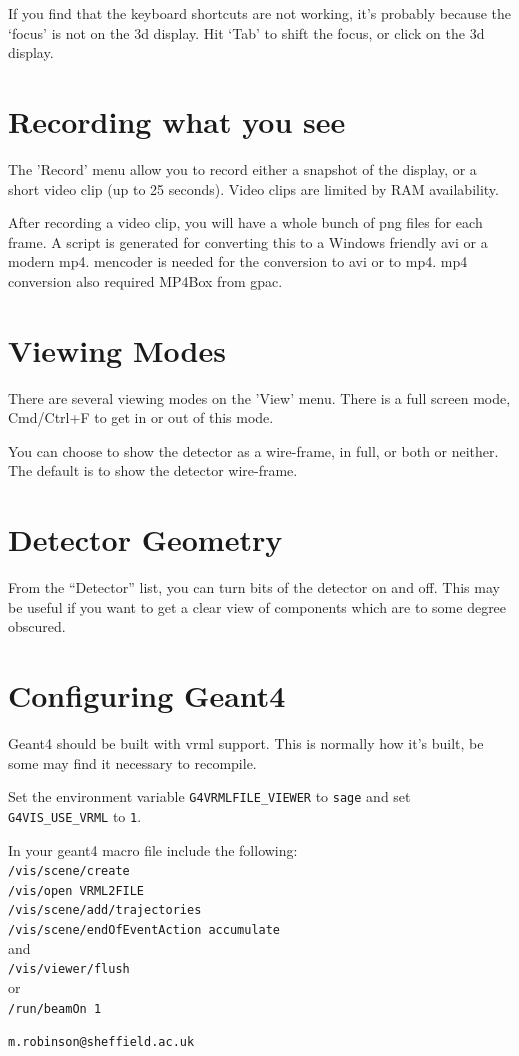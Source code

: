 \documentclass[12pt,a4]{article}
\begin{document}
If you find that the keyboard shortcuts are not working, it's probably because the `focus' is not on the 3d display.  Hit `Tab' to shift the focus, or click on the 3d display.

\section{Recording what you see}

The 'Record' menu allow you to record either a snapshot of the display, or a short video clip (up to 25 seconds).  Video clips are limited by RAM availability.

After recording a video clip, you will have a whole bunch of png files for each frame.  A script is generated for converting this to a Windows friendly avi or a modern mp4.  mencoder is needed for the conversion to avi or to mp4.  mp4 conversion also required MP4Box from gpac.

\section{Viewing Modes}

There are several viewing modes on the 'View' menu.
There is a full screen mode, Cmd/Ctrl+F to get in or out of this mode.

You can choose to show the detector as a wire-frame, in full, or both or neither.  The default is to show the detector wire-frame.

\section{Detector Geometry}

From the ``Detector'' list, you can turn bits of the detector on and off.  This may be useful if you want to get a clear view of components which are to some degree obscured.

\section{Configuring Geant4}

Geant4 should be built with vrml support.  This is normally how it's built, be some may find it necessary to recompile.

Set the environment variable \texttt{G4VRMLFILE\_VIEWER} to \texttt{sage} and set \texttt{G4VIS\_USE\_VRML} to \texttt{1}.

In your geant4 macro file include the following: \\
\texttt{/vis/scene/create} \\
\texttt{/vis/open VRML2FILE} \\
\texttt{/vis/scene/add/trajectories} \\
\texttt{/vis/scene/endOfEventAction accumulate} \\
and \\
\texttt{/vis/viewer/flush} \\
or \\
\texttt{/run/beamOn 1} \\

\vspace{2cm}

\texttt{m.robinson@sheffield.ac.uk}
\end{document}

